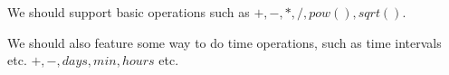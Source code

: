 We should support basic operations such as $+, -, *, /, pow(), sqrt()$.

We should also feature some way to do time operations, such as time intervals etc. $+, -, days, min, hours$ etc.
